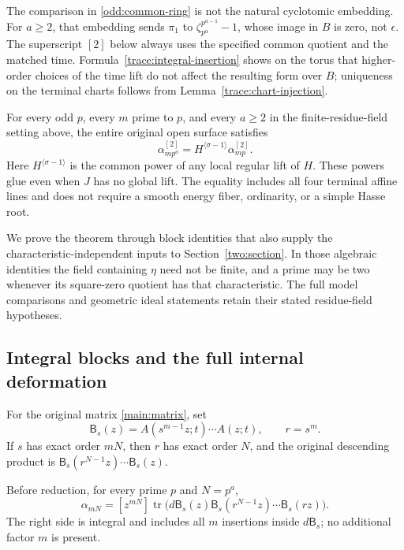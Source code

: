 The comparison in \eqref{odd:common-ring} is not the natural cyclotomic
embedding. For $a\ge2$, that embedding sends $\pi_1$ to
$\zeta_{p^a}^{p^{a-1}}-1$, whose image in $B$ is zero, not $\epsilon$.
The superscript $[2]$ below always uses the specified common quotient
and the matched time. Formula~\eqref{trace:integral-insertion} shows on
the torus that higher-order choices of the time lift do not affect
the resulting form over $B$; uniqueness on the terminal charts follows
from Lemma~\ref{trace:chart-injection}.

\begin{theorem}
\label{odd:factorisation}
For every odd $p$, every $m$ prime to $p$, and every $a\ge2$ in the
finite-residue-field setting above, the entire original open surface
satisfies
\begin{equation}
 \alpha_{mp^a}^{[2]}
 =H^{\langle\sigma-1\rangle}\alpha_{mp}^{[2]}.
 \label{odd:factorisation-equation}
\end{equation}
Here $H^{\langle\sigma-1\rangle}$ is the common power of any local
regular lift of $H$. These powers glue even when $J$ has no global
lift. The equality includes all four terminal affine lines and does
not require a smooth energy fiber, ordinarity, or a simple Hasse root.
\end{theorem}

We prove the theorem through block identities that also supply the
characteristic-independent inputs to Section~\ref{two:section}.
In those algebraic identities the field containing $\eta$ need not be
finite, and a prime may be two whenever its square-zero quotient has
that characteristic. The full model comparisons and geometric ideal
statements retain their stated residue-field hypotheses.

\subsection{Integral blocks and the full internal deformation}

For the original matrix \eqref{main:matrix}, set
\[
 \mathsf B_s(z)=A(s^{m-1}z;t)\cdots A(z;t),\qquad r=s^m.
\]
If $s$ has exact order $mN$, then $r$ has exact order $N$, and the
original descending product is
$\mathsf B_s(r^{N-1}z)\cdots\mathsf B_s(z)$.

\begin{lemma}
\label{odd:block-insertion}
Before reduction, for every prime $p$ and $N=p^a$,
\begin{equation}
 \alpha_{mN}=[z^{mN}]\operatorname{tr}\bigl(
 d\mathsf B_s(z)\mathsf B_s(r^{N-1}z)\cdots\mathsf B_s(rz)\bigr).
 \label{odd:insertion-equation}
\end{equation}
The right side is integral and includes all $m$ insertions inside
$d\mathsf B_s$; no additional factor $m$ is present.
\end{lemma}

